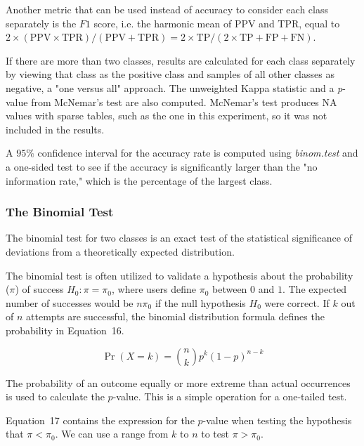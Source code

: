 \documentclass[sn-mathphys-num]{sn-jnl}%
\begin{document}
Another metric that can be used instead of accuracy to consider each class separately is the $F1$ score, i.e. the harmonic mean of PPV and TPR, equal to $2 \times (\mathrm{PPV} \times \mathrm{TPR}) / (\mathrm{PPV} + \mathrm{TPR}) = 2 \times \mathrm{TP} / (2 \times \mathrm{TP} + \mathrm{FP} + \mathrm{FN})$.

If there are more than two classes, results are calculated for each class separately by viewing that class as the positive class and samples of all other classes as negative, a "one versus all" approach.
The unweighted Kappa statistic and a \textit{p}-value from McNemar's test are also computed. McNemar's test produces NA values with sparse tables, such as the one in this experiment, so it was not included in the results.

A $95\%$ confidence interval for the accuracy rate is computed using \textit{binom.test} and a one-sided test \cite{rdocumentationBinomtestFunction, clopper1934use, conover1999practical, hollander2013nonparametric} to see if the accuracy is significantly larger than the "no information rate," which is the percentage of the largest class.

\subsubsection{The Binomial Test}

The binomial test \cite{howell1992statistical, graphpadGraphPadPrism} for two classes is an exact test of the statistical significance of deviations from a theoretically expected distribution.

The binomial test is often utilized to validate a hypothesis about the probability ($\pi$) of success 
$H_{0}\colon \pi =\pi_{0}$, where users define $\pi_{0}$ between $0$ and $1$. The expected number of successes would be $n\pi_{0}$ if the null hypothesis $H_{0}$ were correct. If $k$ out of $n$ attempts are successful, the binomial distribution formula defines the probability in Equation~16.

\begin{equation}
	\Pr(X=k)={\binom{n}{k}}p^{k}(1-p)^{n-k}
	\label{eqn:16}
\end{equation}

The probability of an outcome equally or more extreme than actual occurrences is used to calculate the $p$-value. This is a simple operation for a one-tailed test. 

Equation~17 contains the expression for the $p$-value when testing the hypothesis that $\pi <\pi_{0}$. We can use a range from $k$ to $n$ to test $\pi >\pi_{0}$.
\end{document}
